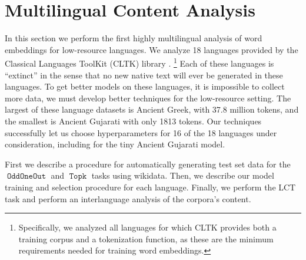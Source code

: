 \documentclass[11pt,a4paper]{article}
\DeclareMathOperator{\OddOneOut}{\texttt{OddOneOut}}
\DeclareMathOperator{\topk}{\texttt{Topk}}
\begin{document}
\section{Multilingual Content Analysis}
\label{sec:mca}

In this section we perform the first highly multilingual analysis of word embeddings for low-resource languages.
We analyze 18 languages provided by the Classical Languages ToolKit (CLTK) library \citep{johnson2014}.%
\footnote{
    Specifically, we analyzed all languages for which CLTK provides both a training corpus and a tokenization function,
    as these are the minimum requirements needed for training word embeddings.
}
Each of these languages is ``extinct'' in the sense that no new native text will ever be generated in these languages.
To get better models on these languages, it is impossible to collect more data,
we must develop better techniques for the low-resource setting.
The largest of these language datasets is Ancient Greek, with 37.8 million tokens,
and the smallest is Ancient Gujarati with only 1813 tokens.
Our techniques successfully let us choose hyperparameters for 16 of the 18 languages under consideration,
including for the tiny Ancient Gujarati model.

First we describe a procedure for automatically generating test set data for the $\OddOneOut$ and $\topk$ tasks using wikidata.
Then, we describe our model training and selection procedure for each language.
Finally, we perform the LCT task and perform an interlanguage analysis of the corpora's content.
\end{document}
